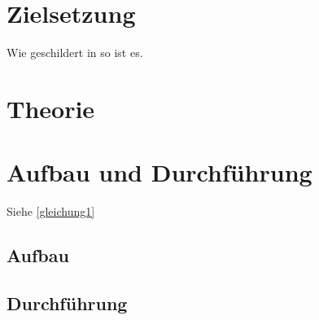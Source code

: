 \maketitle
\tableofcontents
\newpage

\section{Zielsetzung}
Wie geschildert in \cite{anleitung} so ist es.

\section{Theorie}
\section{Aufbau und Durchführung}
  Siehe \eqref{gleichung1}
  \subsection{Aufbau}
  \subsection{Durchführung}
\newpage

